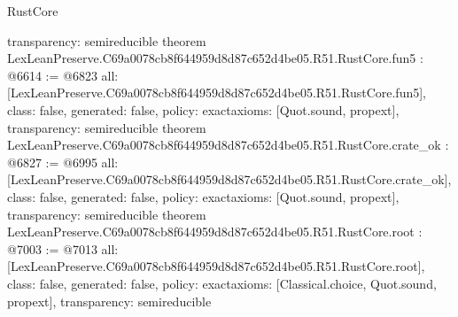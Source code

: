 \begin{lexlean}{RustCore}
\begin{coremodule}
{  transparency: semireducible
}
theorem LexLeanPreserve.C69a0078cb8f644959d8d87c652d4be05.R51.RustCore.fun5 : @6614 := @6823 {
  all: [LexLeanPreserve.C69a0078cb8f644959d8d87c652d4be05.R51.RustCore.fun5],
  class: false,
  generated: false,
  policy: exact{axioms: [Quot.sound, propext]},
  transparency: semireducible
}
theorem LexLeanPreserve.C69a0078cb8f644959d8d87c652d4be05.R51.RustCore.crate_ok : @6827 := @6995 {
  all: [LexLeanPreserve.C69a0078cb8f644959d8d87c652d4be05.R51.RustCore.crate_ok],
  class: false,
  generated: false,
  policy: exact{axioms: [Quot.sound, propext]},
  transparency: semireducible
}
theorem LexLeanPreserve.C69a0078cb8f644959d8d87c652d4be05.R51.RustCore.root : @7003 := @7013 {
  all: [LexLeanPreserve.C69a0078cb8f644959d8d87c652d4be05.R51.RustCore.root],
  class: false,
  generated: false,
  policy: exact{axioms: [Classical.choice, Quot.sound, propext]},
  transparency: semireducible
}


\end{coremodule}
\end{lexlean}
